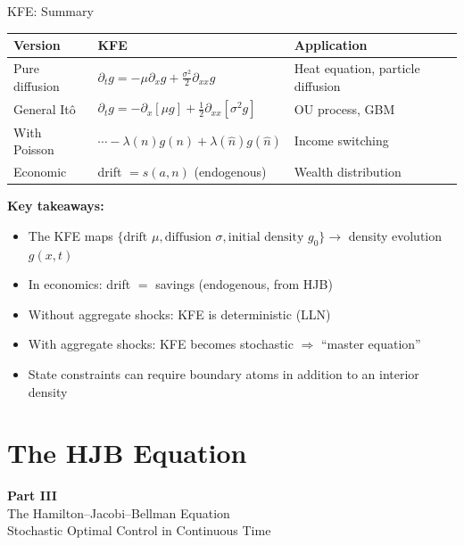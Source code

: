 \documentclass[aspectratio=169,11pt]{beamer}
\newcommand{\emphc}[1]{\textcolor{harvardcrimson}{#1}}
\begin{document}
\begin{frame}{KFE: Summary}
\small
\begin{center}
\renewcommand{\arraystretch}{1.2}
\begin{tabular}{lll}
\toprule
\textbf{Version} & \textbf{KFE} & \textbf{Application} \\
\midrule
Pure diffusion & $\partial_t g = -\mu\partial_x g + \frac{\sigma^2}{2}\partial_{xx}g$ & Heat equation, particle diffusion \\[4pt]
General It\^o & $\partial_t g = -\partial_x[\mu g] + \frac{1}{2}\partial_{xx}[\sigma^2 g]$ & OU process, GBM \\[4pt]
With Poisson & $\cdots - \lambda(n)g(n) + \lambda(\hat{n})g(\hat{n})$ & Income switching \\[4pt]
Economic & drift $= s(a,n)$ (endogenous) & Wealth distribution \\
\bottomrule
\end{tabular}
\end{center}

\vspace{0.2em}
\textbf{Key takeaways:}
\begin{itemize}\itemsep2pt
    \item The KFE maps $\{\text{drift } \mu, \text{diffusion } \sigma, \text{initial density } g_0\} \to$ density evolution $g(x,t)$
    \item In economics: drift $=$ savings (\emphc{endogenous}, from HJB)
    \item Without aggregate shocks: KFE is \emphc{deterministic} (LLN)
    \item With aggregate shocks: KFE becomes \emphc{stochastic} $\Rightarrow$ ``master equation''
    \item State constraints can require boundary atoms in addition to an interior density
\end{itemize}
\end{frame}


\section{The HJB Equation}

\begin{frame}{}
\vfill
\begin{center}
{\Huge \textcolor{uzhblue}{\textbf{Part III}}}\\[12pt]
{\LARGE The Hamilton--Jacobi--Bellman Equation}\\[6pt]
{\large Stochastic Optimal Control in Continuous Time}
\end{center}
\vfill
\end{frame}
\end{document}
